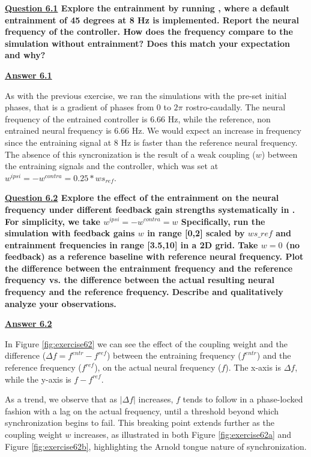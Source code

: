 \documentclass{cmc}
\begin{document}
\textbf{\underline{Question 6.1} Explore the entrainment by running , where a default entrainment of 45 degrees at 8 Hz is implemented. Report the neural frequency of the controller. How does the frequency compare to the simulation without entrainment? Does this match your expectation and why?}

\textbf{\underline{Answer 6.1}}

As with the previous exercise, we ran the simulations with the pre-set initial phases, that is a gradient of phases from 0 to $2\pi$ rostro-caudally.
The neural frequency of the entrained controller is 6.66 Hz, while the reference, non entrained neural frequency is 6.66 Hz. We would expect an increase in frequency since the entraining signal at 8 Hz is faster than the reference neural frequency. The absence of this syncronization is the result of a weak coupling ($w$) between the entraining signals and the controller, which was set at $w^{ipsi}=-w^{contra}=0.25*w s_{ref}$.

\textbf{\underline{Question 6.2} Explore the effect of the entrainment on the neural frequency under different feedback gain strengths systematically in . For simplicity, we take $w^{ipsi} = -w^{contra} = w$
Specifically, run the simulation with feedback gains $w$ in range [0,2] scaled by $ws\_ref$ and entrainment frequencies in range [3.5,10] in a 2D grid. Take $w=0$ (no feedback) as a reference baseline with reference neural frequency. Plot the difference between the entrainment frequency and the reference frequency vs. the difference between the actual resulting neural frequency and the reference frequency. Describe and qualitatively analyze your observations.}


\textbf{\underline{Answer 6.2}}

In Figure \ref{fig:exercise62} we can see the effect of the coupling weight and the difference ($\Delta f = f^{entr} - f^{ref}$) between the entraining frequency ($f^{entr}$) and the reference frequency ($f^{ref}$), on the actual neural frequency ($f$). The x-axis is $\Delta f$, while the y-axis is $f-f^{ref}$.

As a trend, we observe that as $|\Delta f|$ increases, $f$ tends to follow in a phase-locked fashion with a lag on the actual frequency, until a threshold beyond which synchronization begins to fail. This breaking point extends further as the coupling weight $w$ increases, as illustrated in both Figure \ref{fig:exercise62a} and Figure \ref{fig:exercise62b}, highlighting the Arnold tongue nature of synchronization.
\end{document}
